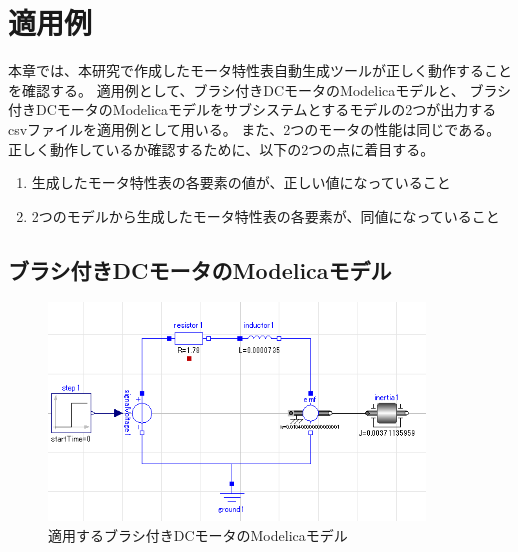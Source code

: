 \chapter{適用例}\label{cha:Indication}
本章では、本研究で作成したモータ特性表自動生成ツールが正しく動作することを確認する。
適用例として、ブラシ付きDCモータのModelicaモデルと、
ブラシ付きDCモータのModelicaモデルをサブシステムとするモデルの2つが出力するcsvファイルを適用例として用いる。
また、2つのモータの性能は同じである。
正しく動作しているか確認するために、以下の2つの点に着目する。


\begin{enumerate}
    \item 生成したモータ特性表の各要素の値が、正しい値になっていること
    \item 2つのモデルから生成したモータ特性表の各要素が、同値になっていること
\end{enumerate}


\section{ブラシ付きDCモータのModelicaモデル}
\begin{figure}[t]
	\centering
	\includegraphics[width=10cm]{./Image/tekiyou_tanntai.png}
	\caption{適用するブラシ付きDCモータのModelicaモデル}
	\label{fig:tekiyou_tanntai}
\end{figure}

